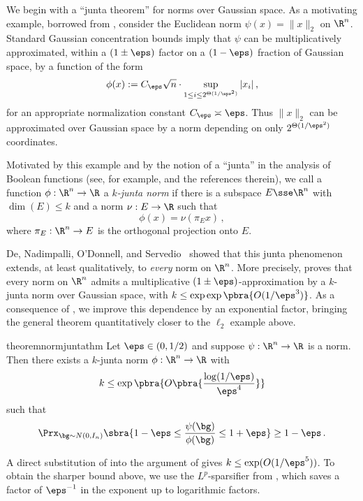 \documentclass[11pt]{article}
\begin{document}
We begin with a ``junta theorem'' for norms over Gaussian space.
As a motivating example, borrowed from \cite{de2026sparsifying}, consider the Euclidean norm $\psi(x)=\|x\|_2$ on $\R^n$. 
Standard Gaussian concentration bounds imply that $\psi$ can be multiplicatively approximated, within a $(1\pm\eps)$ factor on a $(1-\eps)$ fraction of Gaussian space, by a function of the form
\[
	\phi(x) := C_\eps \sqrt{n}\cdot \sup_{1\leq i \leq 2^{\Theta(1/\eps^2)}} |x_i|\,,
\]
for an appropriate normalization constant $C_\eps \asymp \eps$. 
Thus $\|x\|_2$ can be approximated over Gaussian space by a norm depending on only $2^{\Theta(1/\eps^2)}$ coordinates. 

Motivated by this example and by the notion of a ``junta'' in the analysis of Boolean functions (see, for example, \cite{DMN21} and the references therein), we call a function $\phi:\R^n\to\R$ a \emph{$k$-junta norm} if there is a subspace $E\sse\R^n$ with $\dim(E)\leq k$ and a norm $\nu:E\to\R$ such that 
\[
	\phi(x) = \nu(\pi_E x)\,,
\]
where $\pi_E : \R^n \to E$ is the orthogonal projection onto $E$. 

De, Nadimpalli, O'Donnell, and Servedio~\cite{de2026sparsifying} showed that this junta phenomenon extends, at least qualitatively, to \emph{every} norm on $\R^n$. 
More precisely, \cite[Theorem~2]{de2026sparsifying} proves that every norm on $\R^n$ admits a multiplicative $(1\pm\eps)$-approximation by a $k$-junta norm over Gaussian space, with $k \leq \exp\exp\pbra{O(1/\eps^3)}$. 
As a consequence of , we improve this dependence by an exponential factor, bringing the general theorem quantitatively closer to the $\ell_2$ example above. 

\begin{restatable}{theorem}{normjuntathm}
\label{thm:norm-junta}
	Let $\eps \in (0, 1/2)$ and suppose $\psi : \R^n \to \R$ is a norm. 
	Then there exists a $k$-junta norm $\phi: \R^n \to \R$ with 
	\[
		k\leq
		\exp\pbra{
			O\pbra{
				\frac{\log(1/\eps)}{\eps^4}
			}
		}
	\]	
	such that 
	\[
		\Prx_{\bg\sim N(0,I_n)}
		\sbra{
			1-\eps
			\leq
			\frac{\psi(\bg)}{\phi(\bg)}
			\leq
			1+\eps
		}
		\geq
		1-\eps\,.
	\]
\end{restatable}

A direct substitution of  into the argument of \cite[Theorem~2]{de2026sparsifying} gives $k \leq \exp(O(1/\eps^5))$. 
To obtain the sharper bound above, we use the $L^p$-sparsifier from , which saves a factor of $\eps^{-1}$ in the exponent up to logarithmic factors. 
 
\end{document}
